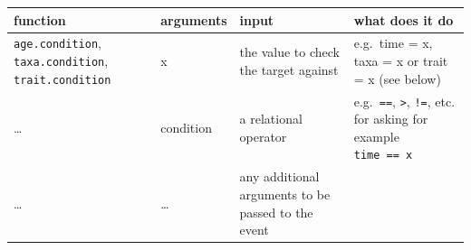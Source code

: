 \documentclass[
]{book}
\begin{document}
\begin{longtable}[]{@{}llll@{}}
\toprule
\begin{minipage}[b]{0.19\columnwidth}\raggedright
function\strut
\end{minipage} & \begin{minipage}[b]{0.23\columnwidth}\raggedright
arguments\strut
\end{minipage} & \begin{minipage}[b]{0.14\columnwidth}\raggedright
input\strut
\end{minipage} & \begin{minipage}[b]{0.33\columnwidth}\raggedright
what does it do\strut
\end{minipage}\tabularnewline
\midrule
\endhead
\begin{minipage}[t]{0.19\columnwidth}\raggedright
\texttt{age.condition}, \texttt{taxa.condition}, \texttt{trait.condition}\strut
\end{minipage} & \begin{minipage}[t]{0.23\columnwidth}\raggedright
x\strut
\end{minipage} & \begin{minipage}[t]{0.14\columnwidth}\raggedright
the value to check the target against\strut
\end{minipage} & \begin{minipage}[t]{0.33\columnwidth}\raggedright
e.g.~time = x, taxa = x or trait = x (see below)\strut
\end{minipage}\tabularnewline
\begin{minipage}[t]{0.19\columnwidth}\raggedright
\ldots{}\strut
\end{minipage} & \begin{minipage}[t]{0.23\columnwidth}\raggedright
condition\strut
\end{minipage} & \begin{minipage}[t]{0.14\columnwidth}\raggedright
a relational operator\strut
\end{minipage} & \begin{minipage}[t]{0.33\columnwidth}\raggedright
e.g.~\texttt{==}, \texttt{\textgreater{}}, \texttt{!=}, etc. for asking for example \texttt{time\ ==\ x}\strut
\end{minipage}\tabularnewline
\begin{minipage}[t]{0.19\columnwidth}\raggedright
\ldots{}\strut
\end{minipage} & \begin{minipage}[t]{0.23\columnwidth}\raggedright
\ldots{}\strut
\end{minipage} & \begin{minipage}[t]{0.14\columnwidth}\raggedright
any additional arguments to be passed to the event\strut
\end{minipage} & \begin{minipage}[t]{0.33\columnwidth}\raggedright
\strut
\end{minipage}\tabularnewline
\bottomrule
\end{longtable}
\end{document}
